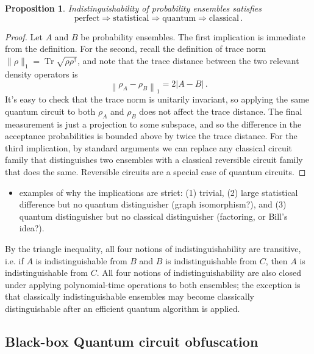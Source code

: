 \documentclass[11pt]{article}
\DeclareMathOperator{\tr}{Tr}
\numberwithin{equation}{section}
\newtheorem{proposition}{Proposition}
\begin{document}
{\begin{proposition} Indistinguishability of probability ensembles satisfies
$$
\text{perfect} \Rightarrow \text{statistical} \Rightarrow \text{quantum} \Rightarrow \text{classical}\,.
$$
\end{proposition}
\begin{proof}
Let $A$ and $B$ be probability ensembles. The first implication is immediate from the definition. For the second, recall the definition of trace norm $\|\rho\|_1 = \tr \sqrt{\rho \rho^\dagger}$, and note that the trace distance between the two relevant density operators is
$$
\left\| \rho_A - \rho_B \right\|_1 = 2 |A - B|\,.
$$
It's easy to check that the trace norm is unitarily invariant, so applying the same quantum circuit to both $\rho_A$ and $\rho_B$ does not affect the trace distance. The final measurement is just a projection to some subspace, and so the difference in the acceptance probabilities is bounded above by twice the trace distance. For the third implication, by standard arguments we can replace any classical circuit family that distinguishes two ensembles with a classical reversible circuit family that does the same. Reversible circuits are a special case of quantum circuits.
\end{proof}

\begin{itemize}
\item examples of why the implications are strict: (1) trivial, (2) large statistical difference but no quantum distinguisher (graph isomorphism?), and (3) quantum distinguisher but no classical distinguisher (factoring, or Bill's idea?).
\end{itemize}

By the triangle inequality, all four notions of indistinguishability are transitive, i.e. if $A$ is indistinguishable from $B$ and $B$ is indistinguishable from $C$, then $A$ is indistinguishable from $C$.  All four notions of indistinguishability are also closed under applying polynomial-time operations to both ensembles; the exception is that classically indistinguishable ensembles may become classically distinguishable after an efficient quantum algorithm is applied. 



\subsection{Black-box Quantum circuit obfuscation}

}
\end{document}
